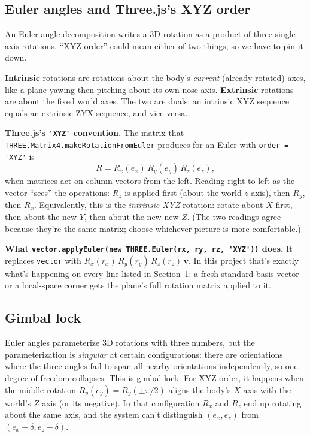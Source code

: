 \documentclass{article}
\begin{document}
\subsection{Euler angles and Three.js's XYZ order}

An Euler angle decomposition writes a 3D rotation as a product of three
single-axis rotations. ``XYZ order'' could mean either of two things, so we
have to pin it down.

\textbf{Intrinsic} rotations are rotations about the body's \emph{current}
(already-rotated) axes, like a plane yawing then pitching about its own
nose-axis. \textbf{Extrinsic} rotations are about the fixed world axes. The
two are duals: an intrinsic XYZ sequence equals an extrinsic ZYX sequence,
and vice versa.

\textbf{Three.js's \lstinline|'XYZ'| convention.} The matrix that
\lstinline|THREE.Matrix4.makeRotationFromEuler| produces for an Euler with
\lstinline|order = 'XYZ'| is
\begin{equation*}
R = R_x(e_x)\,R_y(e_y)\,R_z(e_z),
\end{equation*}
when matrices act on column vectors from the left. Reading right-to-left as
the vector ``sees'' the operations: $R_z$ is applied first (about the world
$z$-axis), then $R_y$, then $R_x$. Equivalently, this is the
\emph{intrinsic XYZ} rotation: rotate about $X$ first, then about the new
$Y$, then about the new-new $Z$. (The two readings agree because they're
the same matrix; choose whichever picture is more comfortable.)

\textbf{What \lstinline|vector.applyEuler(new THREE.Euler(rx, ry, rz, 'XYZ'))| does.}
It replaces \lstinline|vector| with $R_x(r_x)\,R_y(r_y)\,R_z(r_z)\,\mathbf{v}$. In
this project that's exactly what's happening on every line listed in
Section~1: a fresh standard basis vector or a local-space corner gets the
plane's full rotation matrix applied to it.

\subsection{Gimbal lock}

Euler angles parameterize 3D rotations with three numbers, but the parameterization
is \emph{singular} at certain configurations: there are orientations where the
three angles fail to span all nearby orientations independently, so one degree of
freedom collapses. This is gimbal lock. For XYZ order, it happens when the middle
rotation $R_y(e_y) = R_y(\pm \pi/2)$ aligns the body's $X$ axis with the world's
$Z$ axis (or its negative). In that configuration $R_x$ and $R_z$ end up rotating
about the same axis, and the system can't distinguish $(e_x, e_z)$ from
$(e_x + \delta, e_z - \delta)$.
\end{document}

